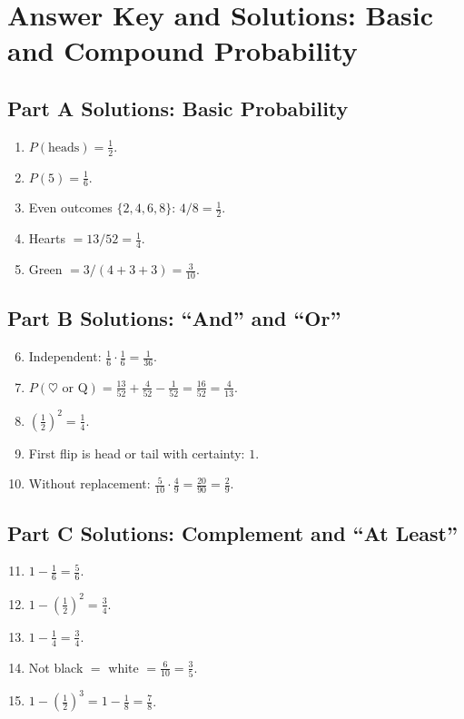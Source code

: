 \documentclass[12pt]{article}
\begin{document}
\newpage


\section*{Answer Key and Solutions: Basic and Compound Probability}

\subsection*{Part A Solutions: Basic Probability}
\begin{enumerate}
  \item \(P(\text{heads})=\tfrac{1}{2}\).
  \item \(P(5)=\tfrac{1}{6}\).
  \item Even outcomes \(\{2,4,6,8\}\): \(4/8=\tfrac{1}{2}\).
  \item Hearts \(=13/52=\tfrac{1}{4}\).
  \item Green \(=3/(4+3+3)=\tfrac{3}{10}\).
\end{enumerate}

\subsection*{Part B Solutions: “And” and “Or”}
\begin{enumerate}
  \setcounter{enumi}{5}
  \item Independent: \(\tfrac{1}{6}\cdot\tfrac{1}{6}=\tfrac{1}{36}\).
  \item \(P(\heartsuit \text{ or Q})=\tfrac{13}{52}+\tfrac{4}{52}-\tfrac{1}{52}=\tfrac{16}{52}=\tfrac{4}{13}\).
  \item \((\tfrac{1}{2})^2=\tfrac{1}{4}\).
  \item First flip is head or tail with certainty: \(1\).
  \item Without replacement: \(\tfrac{5}{10}\cdot\tfrac{4}{9}=\tfrac{20}{90}=\tfrac{2}{9}\).
\end{enumerate}

\subsection*{Part C Solutions: Complement and “At Least”}
\begin{enumerate}
  \setcounter{enumi}{10}
  \item \(1-\tfrac{1}{6}=\tfrac{5}{6}\).
  \item \(1-(\tfrac{1}{2})^2=\tfrac{3}{4}\).
  \item \(1-\tfrac{1}{4}=\tfrac{3}{4}\).
  \item Not black \(=\) white \(= \tfrac{6}{10}=\tfrac{3}{5}\).
  \item \(1-(\tfrac{1}{2})^3=1-\tfrac{1}{8}=\tfrac{7}{8}\).
\end{enumerate}
\end{document}
